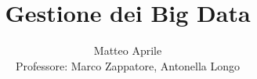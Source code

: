 \documentclass[journal]{IEEEtran}
\begin{document}
\title{Gestione dei Big Data}



\author{Matteo Aprile\\
				Professore: Marco Zappatore, Antonella Longo\\
        }
        
\maketitle

\tableofcontents
\underline{\hspace{ 80 mm }}












\end{document}
